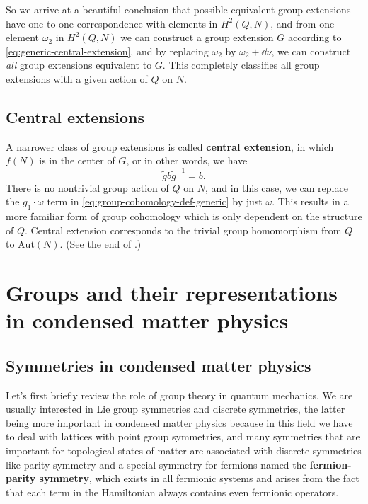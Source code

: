 \documentclass[hyperref, a4paper]{article}
\newcommand*{\concept}[1]{{\textbf{#1}}}
\begin{document}
So we arrive at a beautiful conclusion that possible equivalent group extensions have one-to-one 
correspondence with elements in $H^2(Q, N)$, and from one element $\omega_2$ in $H^2(Q, N)$ we can construct 
a group extension $G$ according to \eqref{eq:generic-central-extension}, and by replacing $\omega_2$
by $\omega_2 + \dd{\nu}$, we can construct \emph{all} group extensions equivalent to $G$. This completely 
classifies all group extensions with a given action of $Q$ on $N$.

\subsection{Central extensions}

A narrower class of group extensions is called \concept{central extension}, in which $f(N)$ is in the 
center of $G$, or in other words, we have 
\begin{equation}
    \tilde{g} b \tilde{g}^{-1} = b.
\end{equation}
There is no nontrivial group action of $Q$ on $N$, and in this case, we can replace the $g_1 \cdot \omega$
term in \eqref{eq:group-cohomology-def-generic} by just $\omega$. This results in a more familiar form 
of group cohomology which is only dependent on the structure of $Q$. Central extension corresponds to 
the trivial group homomorphism from $Q$ to $\mathrm{Aut}(N)$. (See the end of .)

\section{Groups and their representations in condensed matter physics}

\subsection{Symmetries in condensed matter physics}

Let's first briefly review the role of group theory in quantum mechanics.
We are usually interested in Lie group symmetries and discrete symmetries, the latter being more important in 
condensed matter physics because in this field we have to deal with lattices with point group symmetries, 
and many symmetries that are important for topological states of matter are associated with discrete symmetries 
like parity symmetry and a special symmetry for fermions named the \concept{fermion-parity symmetry}, which 
exists in all fermionic systems and arises from the fact that each term in the Hamiltonian always contains 
even fermionic operators.
\end{document}
